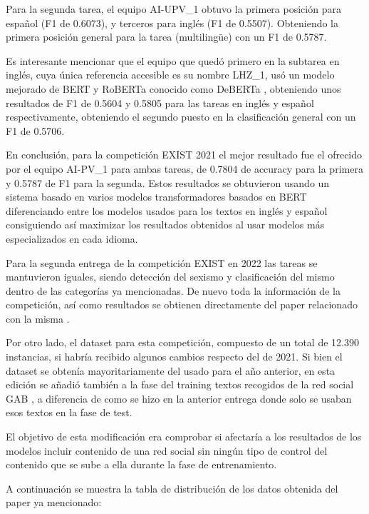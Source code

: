 Para la segunda tarea, el equipo AI-UPV\_1 obtuvo la primera posición para español (F1 de 0.6073), y terceros para inglés (F1 de 0.5507). Obteniendo la primera posición general para la tarea (multilingüe) con un F1 de 0.5787. 

Es interesante mencionar que el equipo que quedó primero en la subtarea en inglés, cuya única referencia accesible es su nombre LHZ\_1, usó un modelo mejorado de BERT y RoBERTa conocido como DeBERTa \cite{he2020deberta}, obteniendo unos resultados de F1 de 0.5604 y 0.5805 para las tareas en inglés y español respectivamente, obteniendo el segundo puesto en la clasificación general con un F1 de 0.5706.

En conclusión, para la competición EXIST 2021 el mejor resultado fue el ofrecido por el equipo AI-PV\_1 para ambas tareas, de 0.7804 de accuracy para la primera y 0.5787 de F1 para la segunda. Estos resultados se obtuvieron usando un sistema basado en varios modelos transformadores basados en BERT diferenciando entre los modelos usados para los textos en inglés y español consiguiendo así maximizar los resultados obtenidos al usar modelos más especializados en cada idioma.


Para la segunda entrega de la competición EXIST en 2022 las tareas se mantuvieron iguales, siendo detección del sexismo y clasificación del mismo dentro de las categorías ya mencionadas. De nuevo toda la información de la competición, así como resultados se obtienen directamente del paper relacionado con la misma \cite{rodriguez2022overview}.

Por otro lado, el dataset para esta competición, compuesto de un total de 12.390 instancias, si habría recibido algunos cambios respecto del de 2021. Si bien el dataset se obtenía mayoritariamente del usado para el año anterior, en esta edición se añadió también a la fase del training textos recogidos de la red social GAB \cite{zhou2019elites}, a diferencia de como se hizo en la anterior entrega donde solo se usaban esos textos en la fase de test.

El objetivo de esta modificación era comprobar si afectaría a los resultados de los modelos incluir contenido de una red social sin ningún tipo de control del contenido que se sube a ella durante la fase de entrenamiento.

A continuación se muestra la tabla de distribución de los datos obtenida del paper ya mencionado:

